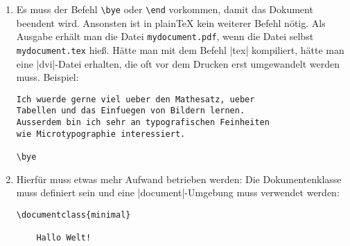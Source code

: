 % 


\begin{enumerate}[label=\alph*)]
	\item Es muss der Befehl \texttt{\textbackslash bye} oder \texttt{\textbackslash end} vorkommen, damit das Dokument beendent wird. Ansonsten ist in plainTeX kein weiterer Befehl nötig. Als Ausgabe erhält man die Datei \verb|mydocument.pdf|, wenn die Datei selbst \verb|mydocument.tex| hieß. Hätte man mit dem Befehl |tex| kompiliert, hätte man eine |dvi|-Datei erhalten, die oft vor dem Drucken erst umgewandelt werden muss. Beispiel:

\begin{lstlisting}
Ich wuerde gerne viel ueber den Mathesatz, ueber
Tabellen und das Einfuegen von Bildern lernen.
Ausserdem bin ich sehr an typografischen Feinheiten
wie Microtypographie interessiert.

\bye
\end{lstlisting}

		\item Hierfür muss etwas mehr Aufwand betrieben werden: Die Dokumentenklasse muss definiert sein und eine |document|-Umgebung muss verwendet werden:
		
\begin{lstlisting}
\documentclass{minimal}

	Hallo Welt!

\end{lstlisting}

\end{enumerate}



